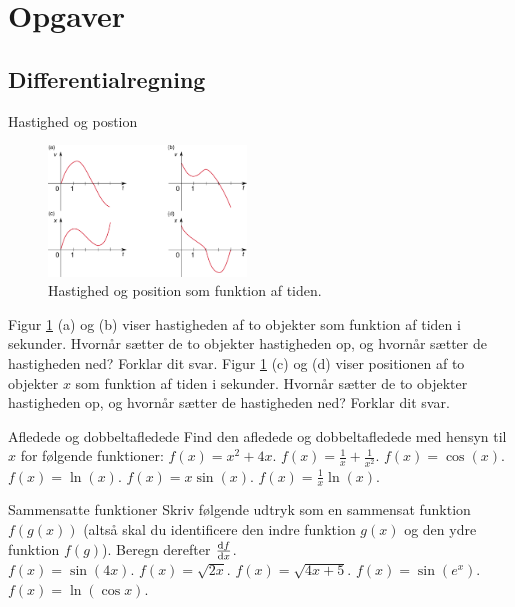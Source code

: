 \section{Opgaver}
\subsection*{Differentialregning}
\begin{opgave}{Hastighed og postion}
	\begin{figure}[h!]
		\centering
		\includegraphics[width=0.47\textwidth]{opg/figurer/vx_grafer.png}
		\caption{Hastighed og position som funktion af tiden.}
		\label{fig:vx_grafer}
	\end{figure}
	\opg Figur \ref{fig:vx_grafer} (a) og (b) viser hastigheden af to objekter som funktion af tiden i sekunder. Hvornår sætter de to objekter hastigheden op, og hvornår sætter de hastigheden ned? Forklar dit svar.
	\opg Figur \ref{fig:vx_grafer} (c) og (d) viser positionen af to objekter $x$ som funktion af tiden i sekunder. Hvornår sætter de to objekter hastigheden op, og hvornår sætter de hastigheden ned? Forklar dit svar.
\end{opgave}
\begin{opgave}{Afledede og dobbeltafledede}
Find den afledede og dobbeltafledede med hensyn til $x$ for følgende funktioner:
\opg $f(x) = x^2 + 4x.$
\opg $f(x) = \frac{1}{x} + \frac{1}{x^2}.$
\opg $f(x) = \cos(x).$
\opg $f(x) = \ln(x).$
\opg $f(x) = x \sin(x).$
\opg $f(x) = \frac{1}{x} \ln(x).$
\end{opgave}
\begin{opgave}{Sammensatte funktioner}
Skriv følgende udtryk som en sammensat funktion $f(g(x))$ (altså skal du identificere den indre funktion $g(x)$ og den ydre funktion $f(g)$). Beregn derefter $\dv{f}{x}$.\\ 
\opg $f(x) = \sin (4x).$
\opg $f(x) = \sqrt{2x}.$
\opg $f(x) = \sqrt{4x+5}.$
\opg $f(x) = \sin(e^x).$
\opg $f(x) =  \ln \left( \cos x \right).$
\end{opgave}
